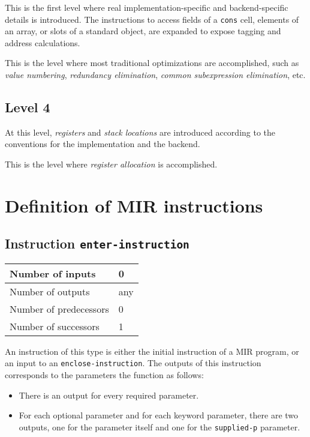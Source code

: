 This is the first level where real implementation-specific and
backend-specific details is introduced.  The instructions to access
fields of a \texttt{cons} cell, elements of an array, or slots of a
standard object, are expanded to expose tagging and address
calculations.

This is the level where most traditional optimizations are
accomplished, such as \emph{value numbering}, \emph{redundancy
  elimination}, \emph{common subexpression elimination}, etc.

\subsection{Level 4}

At this level, \emph{registers} and \emph{stack locations} are
introduced according to the conventions for the implementation and the
backend. 

This is the level where \emph{register allocation} is accomplished.

\section{Definition of MIR instructions}
\label{sec-ir-instructions}

\subsection{Instruction \texttt{enter-instruction}}
\label{mir-instruction-enter}

\begin{tabular}{|l|l|}
\hline
Number of inputs & 0\\
\hline
Number of outputs & any\\
\hline
Number of predecessors & 0\\
\hline
Number of successors & 1\\
\hline
\end{tabular}

An instruction of this type is either the initial instruction of a MIR
program, or an input to an \texttt{enclose-instruction}.  The outputs
of this instruction corresponds to the parameters the function as
follows: 

\begin{itemize}
\item There is an output for every required parameter.
\item For each optional parameter and for each keyword parameter,
  there are two outputs, one for the parameter itself and one for the
  \texttt{supplied-p} parameter.
\end{itemize}

